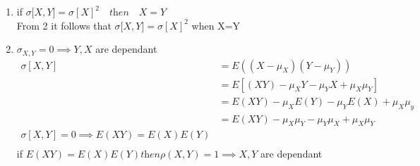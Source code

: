 \documentclass{article}
\begin{document}
\begin{enumerate}
    \item if $\sigma{[X,Y}] = \sigma{[X]}^2 \quad \textit{then} \quad X=Y$\\
    From 2 it follows that  $\sigma{[X,Y}] = \sigma{[X]}^2$  when X=Y\\
    \item \large $\sigma_{X,Y} = 0 \implies Y,X$ are dependant\\
    \begin{align*}
        \sigma{[X,Y]} &= E((X-\mu_X) (Y-\mu_Y))\\
        &= E[(XY) - \mu_XY - \mu_YX + \mu_X\mu_Y] \\
        &= E(XY) - \mu_XE(Y) - \mu_YE(X) + \mu_X\mu_y\\
        &= E(XY) -\mu_X\mu_Y - \mu_Y\mu_X + \mu_X\mu_Y\\
        \sigma{[X,Y]} = 0 \implies E(XY) = E(X)E(Y) &\\
    \end{align*}
    if $E(XY) = E(X)E(Y) \textit{then} \rho(X,Y) = 1 \implies X,Y$ are dependant
\end{enumerate}
\end{document}
